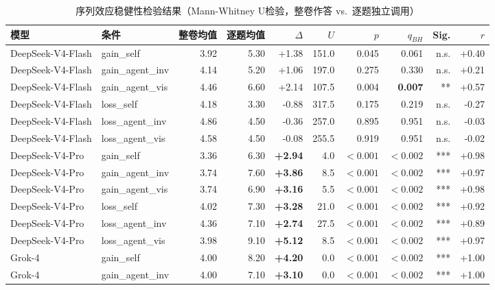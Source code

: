 \begin{table}[tbp]
  \caption{序列效应稳健性检验结果（Mann-Whitney U检验，整卷作答 vs.\ 逐题独立调用）}
  \label{tab:sequence_effect}
  \centering
  \scriptsize
  \setlength{\tabcolsep}{2.2pt}
  \begin{tabular}{llrrrrrrrr}
    \toprule
    模型 & 条件 & 整卷均值 & 逐题均值 & $\Delta$ & $U$ & $p$ & $q_{BH}$ & Sig. & $r$ \\
    \midrule
    DeepSeek-V4-Flash & gain\_self & 3.92 & 5.30 & +1.38 & 151.0 & 0.045 & 0.061 & n.s. & +0.40 \\
    DeepSeek-V4-Flash & gain\_agent\_inv & 4.14 & 5.20 & +1.06 & 197.0 & 0.275 & 0.330 & n.s. & +0.21 \\
    DeepSeek-V4-Flash & gain\_agent\_vis & 4.46 & 6.60 & +2.14 & 107.5 & 0.004 & \textbf{0.007} & ** & +0.57 \\
    DeepSeek-V4-Flash & loss\_self & 4.18 & 3.30 & -0.88 & 317.5 & 0.175 & 0.219 & n.s. & -0.27 \\
    DeepSeek-V4-Flash & loss\_agent\_inv & 4.86 & 4.50 & -0.36 & 257.0 & 0.895 & 0.951 & n.s. & -0.03 \\
    DeepSeek-V4-Flash & loss\_agent\_vis & 4.58 & 4.50 & -0.08 & 255.5 & 0.919 & 0.951 & n.s. & -0.02 \\
    DeepSeek-V4-Pro & gain\_self & 3.36 & 6.30 & \textbf{+2.94} & 4.0 & $<0.001$ & \textbf{$<0.002$} & *** & +0.98 \\
    DeepSeek-V4-Pro & gain\_agent\_inv & 3.74 & 7.60 & \textbf{+3.86} & 8.5 & $<0.001$ & \textbf{$<0.002$} & *** & +0.97 \\
    DeepSeek-V4-Pro & gain\_agent\_vis & 3.74 & 6.90 & \textbf{+3.16} & 5.5 & $<0.001$ & \textbf{$<0.002$} & *** & +0.98 \\
    DeepSeek-V4-Pro & loss\_self & 4.02 & 7.30 & \textbf{+3.28} & 21.0 & $<0.001$ & \textbf{$<0.002$} & *** & +0.92 \\
    DeepSeek-V4-Pro & loss\_agent\_inv & 4.36 & 7.10 & \textbf{+2.74} & 27.5 & $<0.001$ & \textbf{$<0.002$} & *** & +0.89 \\
    DeepSeek-V4-Pro & loss\_agent\_vis & 3.98 & 9.10 & \textbf{+5.12} & 8.5 & $<0.001$ & \textbf{$<0.002$} & *** & +0.97 \\
    Grok-4 & gain\_self & 4.00 & 8.20 & \textbf{+4.20} & 0.0 & $<0.001$ & \textbf{$<0.002$} & *** & +1.00 \\
    Grok-4 & gain\_agent\_inv & 4.00 & 7.10 & \textbf{+3.10} & 0.0 & $<0.001$ & \textbf{$<0.002$} & *** & +1.00 \\

\end{tabular}
\end{table}
